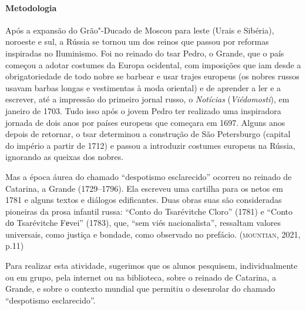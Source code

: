 \documentclass[11pt]{extarticle}
\begin{document}

\paragraph{Metodologia}
Após a expansão do Grão"-Ducado de Moscou para leste (Urais e Sibéria),
noroeste e sul, a Rússia se tornou um dos reinos que passou por reformas
inspiradas no Iluminismo. Foi no reinado do tsar Pedro, o Grande, que o
país começou a adotar costumes da Europa ocidental, com imposições que
iam desde a obrigatoriedade de todo nobre se barbear e usar trajes
europeus (os nobres russos usavam barbas longas e vestimentas à moda
oriental) e de aprender a ler e a escrever, até a impressão do primeiro
jornal russo, o \emph{Notícias} (\emph{Viédomosti}), em janeiro de 1703.
Tudo isso após o jovem Pedro ter realizado uma inspiradora jornada de
dois anos por países europeus que começara em 1697. Alguns anos depois
de retornar, o tsar determinou a construção de São Petersburgo (capital
do império a partir de 1712) e passou a introduzir costumes europeus na
Rússia, ignorando as queixas dos nobres.


Mas a época áurea do chamado ``despotismo esclarecido'' ocorreu no reinado
de Catarina, a Grande (1729--1796). Ela escreveu uma cartilha para os netos em
1781 e alguns textos e diálogos edificantes. Duas obras suas são
consideradas pioneiras da prosa infantil russa: ``Conto do Tsarévitche
Cloro'' (1781) e ``Conto dо Tsarévitche Fеvei'' (1783),
que, ``sem viés nacionalista'', ressaltam valores universais, como
justiça e bondade, como observado no prefácio. (\textsc{mountian}, 2021, p.11)

Para realizar esta atividade, sugerimos que os alunos pesquisem,
individualmente ou em grupo, pela internet ou na biblioteca, sobre o
reinado de Catarina, a Grande, e sobre o contexto mundial que permitiu o
desenrolar do chamado ``despotismo esclarecido''.

\end{document}
